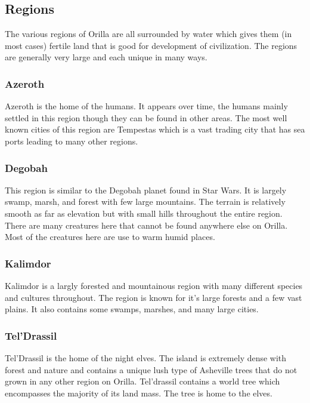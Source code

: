 \subsection{Regions}

The various regions of Orilla are all surrounded by water which gives them (in most cases) fertile land that is good for development of civilization. The regions are generally very large and each unique in many ways.

\subsubsection{Azeroth}

Azeroth is the home of the humans. It appears over time, the humans mainly settled in this region though they can be found in other areas. The most well known cities of this region are Tempestas which is a vast trading city that has sea ports leading to many other regions. 

\subsubsection{Degobah}

This region is similar to the Degobah planet found in Star Wars. It is largely swamp, marsh, and forest with few large mountains. The terrain is relatively smooth as far as elevation but with small hills throughout the entire region. There are many creatures here that cannot be found anywhere else on Orilla. Most of the creatures here are use to warm humid places. 

\subsubsection{Kalimdor}

Kalimdor is a largly forested and mountainous region with many different species and cultures throughout. The region is known for it's large forests and a few vast plains. It also contains some swamps, marshes, and many large cities.

\subsubsection{Tel'Drassil}

Tel'Drassil is the home of the night elves. The island is extremely dense with forest and nature and contains a unique lush type of Asheville trees that do not grown in any other region on Orilla. Tel'drassil contains a world tree which encompasses the majority of its land mass. The tree is home to the elves.

